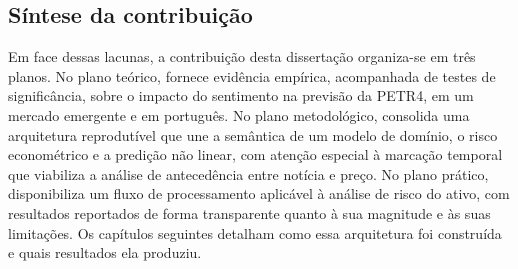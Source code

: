 \subsection{Síntese da contribuição}
Em face dessas lacunas, a contribuição desta dissertação organiza-se em três planos. No plano teórico, fornece evidência empírica, acompanhada de testes de significância, sobre o impacto do sentimento na previsão da PETR4, em um mercado emergente e em português. No plano metodológico, consolida uma arquitetura reprodutível que une a semântica de um modelo de domínio, o risco econométrico e a predição não linear, com atenção especial à marcação temporal que viabiliza a análise de antecedência entre notícia e preço. No plano prático, disponibiliza um fluxo de processamento aplicável à análise de risco do ativo, com resultados reportados de forma transparente quanto à sua magnitude e às suas limitações. Os capítulos seguintes detalham como essa arquitetura foi construída e quais resultados ela produziu.
